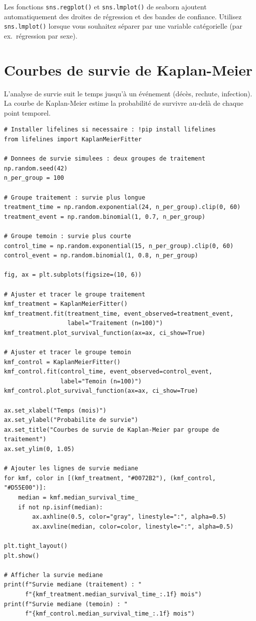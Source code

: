 \begin{pythontip}
Les fonctions \texttt{sns.regplot()} et \texttt{sns.lmplot()} de seaborn ajoutent automatiquement des droites de r\'egression et des bandes de confiance. Utilisez \texttt{sns.lmplot()} lorsque vous souhaitez s\'eparer par une variable cat\'egorielle (par ex.\ r\'egression par sexe).
\end{pythontip}

\section{Courbes de survie de Kaplan-Meier}

L'analyse de survie suit le temps jusqu'\`a un \'ev\'enement (d\'ec\`es, rechute, infection). La courbe de Kaplan-Meier estime la probabilit\'e de survivre au-del\`a de chaque point temporel.

\begin{verbatim}
# Installer lifelines si necessaire : !pip install lifelines
from lifelines import KaplanMeierFitter

# Donnees de survie simulees : deux groupes de traitement
np.random.seed(42)
n_per_group = 100

# Groupe traitement : survie plus longue
treatment_time = np.random.exponential(24, n_per_group).clip(0, 60)
treatment_event = np.random.binomial(1, 0.7, n_per_group)

# Groupe temoin : survie plus courte
control_time = np.random.exponential(15, n_per_group).clip(0, 60)
control_event = np.random.binomial(1, 0.8, n_per_group)

fig, ax = plt.subplots(figsize=(10, 6))

# Ajuster et tracer le groupe traitement
kmf_treatment = KaplanMeierFitter()
kmf_treatment.fit(treatment_time, event_observed=treatment_event,
                  label="Traitement (n=100)")
kmf_treatment.plot_survival_function(ax=ax, ci_show=True)

# Ajuster et tracer le groupe temoin
kmf_control = KaplanMeierFitter()
kmf_control.fit(control_time, event_observed=control_event,
                label="Temoin (n=100)")
kmf_control.plot_survival_function(ax=ax, ci_show=True)

ax.set_xlabel("Temps (mois)")
ax.set_ylabel("Probabilite de survie")
ax.set_title("Courbes de survie de Kaplan-Meier par groupe de traitement")
ax.set_ylim(0, 1.05)

# Ajouter les lignes de survie mediane
for kmf, color in [(kmf_treatment, "#0072B2"), (kmf_control, "#D55E00")]:
    median = kmf.median_survival_time_
    if not np.isinf(median):
        ax.axhline(0.5, color="gray", linestyle=":", alpha=0.5)
        ax.axvline(median, color=color, linestyle=":", alpha=0.5)

plt.tight_layout()
plt.show()

# Afficher la survie mediane
print(f"Survie mediane (traitement) : "
      f"{kmf_treatment.median_survival_time_:.1f} mois")
print(f"Survie mediane (temoin) : "
      f"{kmf_control.median_survival_time_:.1f} mois")
\end{verbatim}

